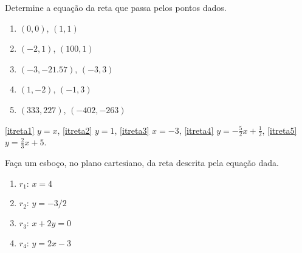 \begin{exo}
Determine a equação da reta que passa pelos pontos dados.
\begin{multicols}{2}
\begin{enumerate}
\item\label{itreta1} $(0,0)$, $(1,1)$
\item\label{itreta2} $(-2,1)$, $(100,1)$
\item\label{itreta3} $(-3,-21.57)$, $(-3,3)$ 
\item\label{itreta4} $(1,-2)$, $(-1,3)$ 
\item\label{itreta5} $(333,227)$, $(-402,-263)$ 
\end{enumerate}
\end{multicols}
\vspace{0.01cm}
\begin{sol}
\eqref{itreta1} $y=x$,
\eqref{itreta2} $y=1$,
\eqref{itreta3} $x=-3$,
\eqref{itreta4} $y=-\tfrac{5}{2}x+\tfrac12$,
\eqref{itreta5} $y=\tfrac{2}{3}x+5$.
\end{sol}
\end{exo}

\begin{exo}\label{ExoEsbocoretas}
Faça um esboço, no plano cartesiano, da reta descrita pela equação dada.
\begin{multicols}{3}
\begin{enumerate}
\item\label{itretta1} $r_1:\,x=4$
 \item\label{itretta2} $r_2:\,y=-3/2$
\item \label{itrett3} $r_3:\,x+2y=0$
\item \label{itrett4} $r_4:\,y=2x-3$
\end{enumerate}
\end{multicols}
\vspace{0.01cm}
\begin{sol}

\mbox{}
\begin{center}
\begin{bmlimage}\end{bmlimage}
\end{center}
\end{sol}
\end{exo}

